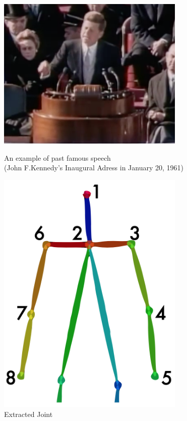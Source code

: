 \begin{figure}[htbp]
\centering
\begin{minipage}[t]{0.55\textwidth}
\centering
\includegraphics[width=0.8\textwidth]{./img/pastspeech.png}
  \caption[An example of past famous speech]{An example of past famous speech \protect\\
  (John F.Kennedy's Inaugural Adress in January 20, 1961)}
\label{fig:pastspeech}
\end{minipage}
\begin{minipage}[t]{0.35\textwidth}
\centering
\includegraphics[width=0.8\textwidth]{./img/joint.png}
\caption{Extracted Joint}
\label{fig:joint}
\end{minipage}
\end{figure}

